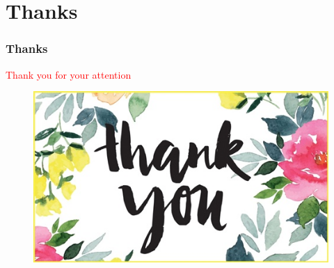 \documentclass{beamer}
\begin{document}
\section{Thanks}
\begin{frame}
  \frametitle{Thanks}
  \begin{center}
    \huge {\textcolor{red}{Thank you for your attention}}
    \begin{figure}
      \includegraphics[scale=1.5]{./img/thanks.jpg}
    \end{figure}
  \end{center}
\end{frame}

  
 
\end{document}
